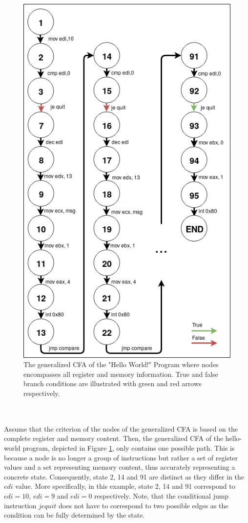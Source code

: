 \documentclass{kththesis}
\begin{document}
\begin{figure}[th]
    \centering
    \includegraphics[scale=0.4]{Images/CFA.png}
    \caption[The generalized CFA of the "Hello World!" Program where nodes encompasses all register and memory information.]{The generalized CFA of the "Hello World!" Program where nodes encompasses all register and memory information. True and false branch conditions are illustrated with green and red arrows respectively.}
    \label{fig:HelloCFA}
\end{figure}
\noindent
\\ \\
Assume that the criterion of the nodes of the generalized CFA is based on the complete register and memory content. Then, the generalized CFA of the hello-world program, depicted in Figure \ref{fig:HelloCFA}, only contains one possible path. This is because a node is no longer a group of instructions but rather a set of register values and a set representing memory content, thus accurately representing a concrete state. Consequently, state 2, 14 and 91 are distinct as they differ in the $edi$ value. More specifically, in this example, state 2, 14 and 91 correspond to $edi=10$, $edi=9$ and $edi=0$ respectively. Note, that the conditional jump instruction $je quit$ does not have to correspond to two possible edges as the condition can be fully determined by the state.
\end{document}
